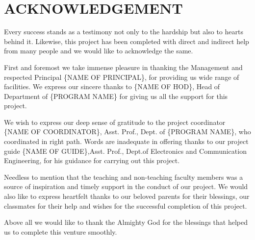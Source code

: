 \linespread{1.3}
\vspace*{0.5cm}
\chapter*{ACKNOWLEDGEMENT}

\hspace*{1cm} Every success stands as a testimony not only to the hardship but also to hearts behind it. Likewise, this project has been completed with direct and indirect help from many people and we would like to acknowledge the same.

First and foremost we take immense pleasure in thanking the Management and respected Principal \{NAME OF PRINCIPAL\}, for providing us wide range of facilities. We express our sincere thanks to  \{NAME OF HOD\}, Head of Department of  \{PROGRAM NAME\} for giving us all the support for this project.

We wish to express our deep sense of gratitude to the project coordinator  \{NAME OF COORDINATOR\}, Asst. Prof., Dept. of \{PROGRAM NAME\}, who coordinated in right path. Words are inadequate in offering thanks to our project guide \{NAME OF GUIDE\},Asst. Prof., Dept.of Electronics and Communication Engineering, for his guidance for carrying out this project.

Needless to mention that the teaching and non-teaching faculty members was a source of inspiration and timely support in the conduct of our project. We would also like to express heartfelt thanks to our beloved parents for their blessings, our classmates for their help and wishes for the successful completion of this project.

Above all we would like to thank the Almighty God for the blessings that helped us to complete this venture smoothly.